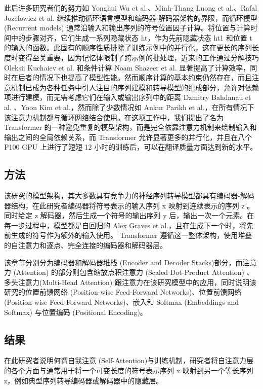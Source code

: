 此后许多研究者们的努力如 Yonghui Wu et al.、Minh-Thang Luong et al.、Rafal Jozefowicz et al. 继续推动循环语言模型和编码器-解码器架构的界限，而循环模型 (Recurrent models) 通常沿输入和输出序列的符号位置因子计算。将位置与计算时间中的步骤对齐，它们生成一系列隐藏状态 ht，作为先前隐藏状态 ht1 和位置 t 的输入的函数。此固有的顺序性质排除了训练示例中的并行化，这在更长的序列长度时变得至关重要，因为记忆体限制了跨示例的批处理，近来的工作通过分解技巧 Oleksii Kuchaiev et al. 和条件计算 Noam Shazeer et al. 显著提高了计算效率，同时在后者的情况下也提高了模型性能。然而顺序计算的基本约束仍然存在，而且注意机制已成为各种任务中引人注目的序列建模和转导模型的组成部分，允许对依赖项进行建模，而无需考虑它们在输入或输出序列中的距离 Dzmitry Bahdanau et al. 、Yoon Kim et al.，然而除了少数情况如 Ankur Parikh et al.，在所有情况下该注意力机制都与循环网络结合使用。在这项工作中，我们提出了名为 Transformer 的一种避免重复的模型架构，而是完全依靠注意力机制来绘制输入和输出之间的全局依赖关系，而 Transformer 允许显著更多的并行化，并且在八个 P100 GPU 上进行了短短 12 小时的训练后，可以在翻译质量方面达到新的水平。

\subsection{方法}

该研究的模型架构，其大多数具有竞争力的神经序列转导模型都具有编码器-解码器结构，在此研究者编码器将符号表示的输入序列 x 映射到连续表示的序列 z 。同时给定 z 解码器，然后生成一个符号的输出序列 y 后，输出一次一个元素。在每一步过程中，模型都是自回归的 Alex Graves et al.，且在生成下一个时，将先前生成的符号作为额外的输入使用。 Transformer 遵循这一整体架构，使用堆叠的自注意力和逐点、完全连接的编码器和解码器层。

该章节分别分为编码器和解码器堆栈 (Encoder and Decoder Stacks)部分，而注意力 (Attention) 的部分则包含缩放点积注意力 (Scaled Dot-Product Attention) 、多头注意力(Multi-Head Attention) 跟注意力在该研究模型中的应用，同时说明该研究的位置前馈网络 (Position-wise Feed-Forward Networks)、位置前馈网络(Position-wise Feed-Forward Networks)、嵌入和 Softmax (Embeddings and Softmax) 与位置编码 (Positional Encoding)。

\subsection{结果}

在此研究者说明何谓自我注意 (Self-Attention)与训练机制，研究者将自注意力层的各个方面与通常用于将一个可变长度的符号表示序列 x 映射到另一个等长序列 z，例如典型序列转导编码器或解码器中的隐藏层。

